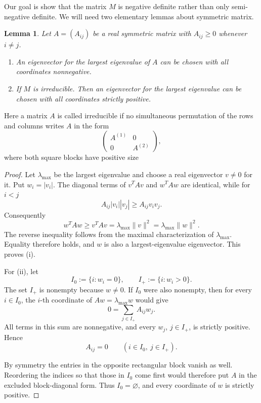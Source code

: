 \documentclass[reqno]{amsart}
\theoremstyle{remark}
\theoremstyle{plain}
\newtheorem{lemma}[thm]{Lemma}
\begin{document}
Our goal is show that the matrix $M$ is  negative definite rather than only semi-negative definite. 
We will need two elementary lemmas about symmetric matrix. \begin{lemma}\label{lem:sign-matrix}
Let $A=(A_{ij})$ be a real symmetric matrix with
$A_{ij}\geq0$ whenever $i\neq j$.
\begin{enumerate}[label=\textup{(\roman*)}]
\item An eigenvector for the largest eigenvalue of $A$ can be chosen
      with all coordinates nonnegative.
\item If $M$ is irreducible.  Then an eigenvector
      for the largest eigenvalue can be chosen with all coordinates
      strictly positive.
\end{enumerate}
\end{lemma}
Here a matrix $A$ is called irreducible if no simultaneous permutation of the rows and columns
      writes $A$ in the form
      \[
        \begin{pmatrix}A^{(1)}&0\\0&A^{(2)}\end{pmatrix},
      \]
      where both square blocks have positive size
\begin{proof}
Let $\lambda_{\max}$ be the largest eigenvalue and choose a real
eigenvector $v\neq0$ for it.  Put $w_i=|v_i|$.  The diagonal terms
of $v^TAv$ and $w^TAw$ are identical, while for $i<j$
\[
 A_{ij}|v_i||v_j|\geq A_{ij}v_iv_j.
\]
Consequently
\[
 w^TAw\geq v^TAv
          =\lambda_{\max}\lVert v\rVert^2
          =\lambda_{\max}\lVert w\rVert^2.
\]
The reverse inequality follows from the maximal characterization of
$\lambda_{\max}$.  Equality therefore holds, and $w$ is also a
largest-eigenvalue eigenvector.  This proves (i).

For (ii), let
\[
 I_0:=\{i:w_i=0\},
 \qquad
 I_+:=\{i:w_i>0\}.
\]
The set $I_+$ is nonempty because $w\neq0$.  If $I_0$ were also
nonempty, then for every $i\in I_0$, the $i$-th coordinate of
$Aw=\lambda_{\max}w$ would give
\[
 0=\sum_{j\in I_+}A_{ij}w_j.
\]
All terms in this sum are nonnegative, and every $w_j$, $j\in I_+$,
is strictly positive.  Hence
\[
 A_{ij}=0\qquad(i\in I_0,\ j\in I_+).
\]

By symmetry the entries in the opposite rectangular block vanish as
well.  Reordering the indices so that those in $I_0$ come first would
therefore put $A$ in the excluded block-diagonal form.  Thus
$I_0=\varnothing$, and every coordinate of $w$ is strictly positive.
\end{proof}
\end{document}
